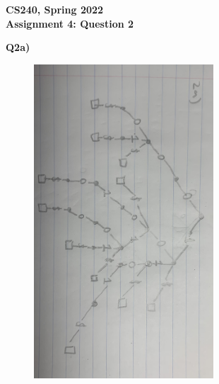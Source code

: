 \documentclass[12pt]{article}
\begin{document}
\begin{center}
{\Large\textbf{CS240, Spring 2022}}\\
\vspace{2mm}
{\Large\textbf{Assignment 4: Question 2}}\\
\vspace{3mm}
\end{center}
\begin{adjustwidth}{0em}{0pt}
\textbf{Q2a)} 
\begin{figure}[tbhp]
	\begin{center}
		\includegraphics[width=0.6\textwidth, angle=90]{2a.jpg}
	\end{center}
\end{figure}
\end{adjustwidth} 
\newpage
\end{document}

